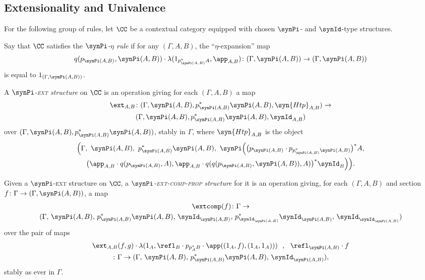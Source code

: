 \subsection{Extensionality and Univalence} \label{subsec:optional-rules-alg}

For the following group of rules, let $\CC$ be a contextual category equipped with chosen $\synPi$- and $\synId$-type structures.

\begin{definition}
Say that $\CC$ satisfies the \emph{$\synPi$-$\eta$ rule} if for any $(\Gamma,A,B)$, the ``$\eta$-expansion'' map
\[ q(p_{\synPi(A,B)},\synPi(A,B)) \cdot \lambda (1_{p_{\synPi(A,B)}^*A},\app_{A,B})  \colon (\Gamma,\synPi(A,B)) \to (\Gamma,\synPi(A,B)) \]
is equal to $1_{(\Gamma,\synPi(A,B))}$.

A \emph{$\synPi$-\textsc{ext} structure} on $\CC$ is an operation giving for each $(\Gamma,A,B)$ a map 
\begin{multline*}
  \ext_{A,B} \colon (\Gamma,\synPi(A,B),p_{\synPi(A,B)}^*\synPi(A,B),\syn{Htp}_{A,B}) \to \\
  (\Gamma,\synPi(A,B),p_{\synPi(A,B)}^*\synPi(A,B),\synId_{A,B})
\end{multline*}
over $(\Gamma,\synPi(A,B),p_{\synPi(A,B)}^*\synPi(A,B))$, stably in $\Gamma$, where $\syn{Htp}_{A,B}$ is the object
\begin{multline*}
   \Big( \Gamma,\ \synPi(A,B),\ p_{\synPi(A,B)}^*\synPi(A,B),\ 
   \synPi\Big( \big(p_{\synPi(A,B)} \cdot p_{p_{\synPi(A,B)}^*\synPi(A,B)} \big)^*A, \\
   \big(\app_{A,B} \cdot q(p_{\synPi(A,B)},A), \app_{A,B} \cdot q(q(p_{\synPi(A,B)},\synPi(A,B)),A) \big)^* \synId_B \Big) \Big).
\end{multline*}

Given a $\synPi$-\textsc{ext} structure on $\CC$, a \emph{$\synPi$-\textsc{ext-comp-prop} structure} for it is an operation giving, for each $(\Gamma,A,B)$ and section $f \colon \Gamma \to (\Gamma,\synPi(A,B))$, a map 
\begin{multline*} \extcomp(f) \colon \Gamma \to \\
  (\Gamma,\,\synPi(A,B),\, p_{\synPi(A,B)}^*\synPi(A,B),\, \synId_{\synPi(A,B)},\, p_{\synId_{\synPi(A,B)}}^*\synId_{\synPi(A,B)},\, \synId_{\synId_{\synPi(A,B)}})
\end{multline*}
over the pair of maps
\begin{multline*} \ext_{A,B}(f,g) \cdot \lambda(1_A,\refl_B \cdot p_{p_A^*B}\cdot \app((1_A,f),(1_A,1_A)))\ \ ,\ \ \refl_{\synPi(A,B)} \cdot f \\
\colon \Gamma \to (\Gamma,\,\synPi(A,B),\, p_{\synPi(A,B)}^*\synPi(A,B),\, \synId_{\synPi(A,B)}),
\end{multline*}
stably as ever in $\Gamma$.

\end{definition}

